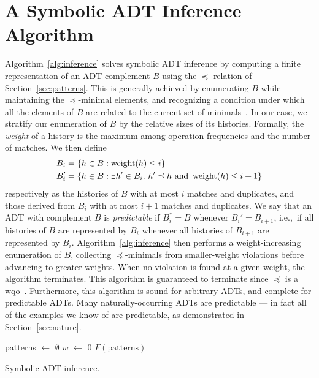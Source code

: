 \section{A Symbolic ADT Inference Algorithm}
\label{sec:algorithm}

Algorithm~\ref{alg:inference} solves symbolic ADT inference by
computing a finite representation of an ADT complement $B$ using the $\preceq$
relation of Section~\ref{sec:patterns}. This is generally achieved by
enumerating $B$ while maintaining the $\preceq$-minimal
elements, and recognizing a condition under which all the elements of $B$ are
related to the current set of minimals~\cite{conf/lics/AbdullaCJT96,
journals/tcs/FinkelS01}. In our case, we stratify our enumeration of $B$ by the
relative sizes of its histories. Formally, the \emph{weight} of a history
is the maximum among operation frequencies and the number of matches. We then
define
\begin{align*}
  & B_i = {\{{ h \in B : \operatorname{weight}(h) \le i }\}} \\
  & B_i' = {\{{ h \in B : \exists h' \in B_i.\ h' \preceq h \text{ and } \operatorname{weight}(h) \le i+1 }\}}
\end{align*}
respectively as the histories of $B$ with at most $i$ matches and duplicates,
and those derived from $B_i$ with at most $i+1$ matches and duplicates. We say
that an ADT with complement $B$ is \emph{predictable} if $B_i^* = B$ whenever
$B_i' = B_{i+1}$, i.e.,~if all histories of $B$ are represented by $B_i$ whenever
all histories of $B_{i+1}$ are represented by $B_i$. Algorithm~\ref{alg:inference}
then performs a weight-increasing enumeration of $B$, collecting
$\preceq$-minimals from smaller-weight violations before advancing to greater
weights. When no violation is found at a given weight, the algorithm terminates.
This algorithm is guaranteed to terminate since $\preceq$ is a
wqo~\cite{conf/lics/AbdullaCJT96, journals/tcs/FinkelS01}. Furthermore, this
algorithm is sound for arbitrary ADTs, and complete for predictable ADTs.
Many naturally-occurring ADTs are predictable — in fact all of the examples we
know of are predictable, as demonstrated in Section~\ref{sec:nature}.

\begin{algorithm}[t]
  \SetAlgoLined
  patterns $\gets$ $\emptyset$ \;
  $w$ $\gets$ $0$ \;
  \Return $F(\text{patterns})$
  \caption{Symbolic ADT inference.}
  \label{alg:inference}
\end{algorithm}

